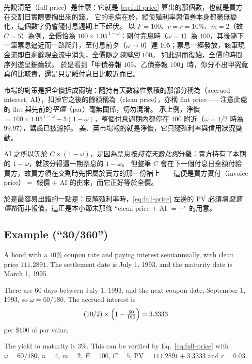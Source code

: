 \begin{remark}
	先說清楚（full price）是什麼：它就是 \eqref{eq:full-price} 算出的那個數，也就是買方在交割日實際要掏出來的錢。
	它的毛病在於，縱使殖利率與債券本身都毫無變化，這個數字仍會隨付息週期上下起伏。
	以 $F = 100$、$c = r = 10\%$、$m = 2$（故 $C = 5$）為例，全價恰為 $100 \times 1.05^{\,1-\omega}$：剛付完息時（$\omega = 1$）為 $100$，其後隨下一筆票息逼近而一路爬升，至付息前夕（$\omega \to 0$）達 $105$；票息一經發放，該筆現金流即自剩餘現金流中消失，全價隨之\emph{驟降回 $100$}。
	如此週而復始，全價的時間序列遂呈鋸齒狀。
	於是看到「甲債券報 $105$、乙債券報 $100$」時，你分不出甲究竟真的比較貴，還是只是離付息日比較近而已。

	市場的對策是把全價拆成兩塊：隨持有天數線性累積的那部分稱為（accrued interest, AI），扣掉它之後的餘額稱為（clean price），亦稱 flat price——注意此處的 flat 與先前的\emph{平價}（par）毫無關係，切勿混淆。
	承上例，淨價 $= 100 \times 1.05^{\,1-\omega} - 5(1-\omega)$，整個付息週期內都停在 $100$ 附近（$\omega = 1/2$ 時為 $99.97$），鋸齒已被濾掉。
	美、英市場報的就是淨價，它只隨殖利率與信用狀況變動。

	AI 之所以等於 $C \times (1-\omega)$，是因為票息按\emph{持有天數比例}分攤：賣方持有了本期的 $1-\omega$，就該分得這一期票息的 $1-\omega$。
	但整筆 $C$ 會在下一個付息日全額付給買方，故買方須在交割時先把屬於賣方的那一份補上——這便是買方實付（invoice price）$=$ 報價 $+$ AI 的由來，而它正好等於全價。

	於是最容易出錯的一點是：反解殖利率時，\eqref{eq:full-price} 左邊的 PV 必須填\emph{發票價格}而非報價，這正是本小節末那條 ``clean price $+$ AI $= \cdots$'' 的用意。
\end{remark}
\suppend

\subsection{Example (``30/360'')}

\begin{eg}
	\label{eg:full-price}
	A bond with a $10\%$ coupon rate and paying interest semiannually, with clean price $111.2891$.
	The settlement date is July 1, 1993, and the maturity date is March 1, 1995.

	There are 60 days between July 1, 1993, and the next coupon date, September 1, 1993, so $\omega = 60/180$.
	The accrued interest is
	\[
		(10/2)\times\Bigl(1-\tfrac{60}{180}\Bigr) = 3.3333
	\]
	per \$100 of par value.

	The yield to maturity is $3\%$.
	This can be verified by Eq.~\eqref{eq:full-price} with $\omega = 60/180$, $n = 4$, $m = 2$, $F = 100$, $C = 5$, $\mathrm{PV} = 111.2891 + 3.3333$ and $r = 0.03$.
\end{eg}


